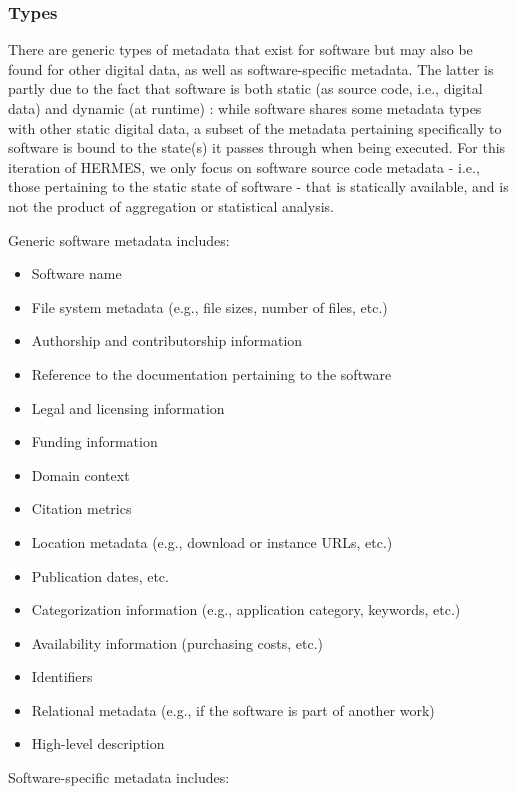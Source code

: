 \documentclass{article}
\begin{document}
\subsubsection{Types}\label{subsec:metadata-types}
There are generic types of metadata that exist for software but may also be found for other digital data, as well as software-specific metadata. The latter is partly due to the fact that software is both static (as source code, i.e., digital data) and dynamic (at runtime) \cite{138880/U87URNI5}: while software shares some metadata types with other static digital data, a subset of the metadata pertaining specifically to software is bound to the state(s) it passes through when being executed. For this iteration of HERMES, we only focus on software source code metadata - i.e., those pertaining to the static state of software - that is statically available, and is not the product of aggregation or statistical analysis.

Generic software metadata includes:

\begin{itemize}  
  \item Software name
  \item File system metadata (e.g., file sizes, number of files, etc.)
  \item Authorship and contributorship information
  \item Reference to the documentation pertaining to the software
  \item Legal and licensing information
  \item Funding information
  \item Domain context
  \item Citation metrics
  \item Location metadata (e.g., download or instance URLs, etc.)
  \item Publication dates, etc.
  \item Categorization information (e.g., application category, keywords, etc.)
  \item Availability information (purchasing costs, etc.)
  \item Identifiers
  \item Relational metadata (e.g., if the software is part of another work)
  \item High-level description
\end{itemize}

Software-specific metadata includes:
\end{document}
